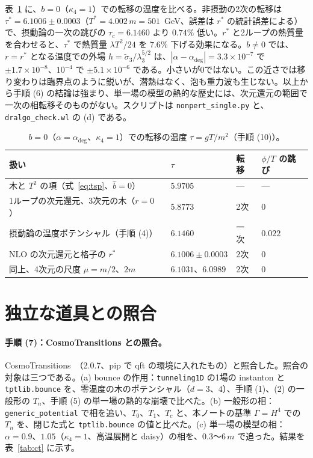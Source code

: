 \documentclass[a4paper,10pt]{ltjsarticle}
\begin{document}
表~\ref{tab:nonpert} に、$b=0$（$\kappa_4=1$）での転移の温度を比べる。非摂動の2次の転移は $\tau^*=6.1006\pm0.0003$（$T^*=4.002\,m=501$~GeV、誤差は $r^*$ の統計誤差による）で、摂動論の一次の跳びの $\tau_c=6.1460$ より $0.74\%$ 低い。$r^*$ と2ループの熱質量を合わせると、$\tau^*$ で熱質量 $\lambda T^2/24$ を $7.6\%$ 下げる効果になる。$b\ne0$ では、$r=r^*$ となる温度での外場 $h=\tilde\sigma_3/\lambda_3^{5/2}$ は、$|\alpha-\alpha_{\mathrm{deg}}|=3.3\times10^{-7}$ で $\pm1.7\times10^{-8}$、$10^{-4}$ で $\pm5.1\times10^{-6}$ である。小さいが0ではない。この近さでは移り変わりは臨界点のように鋭いが、潜熱はなく、泡も重力波も生じない。以上から手順 (6) の結論は強まり、単一場の模型の熱的な歴史には、次元還元の範囲で一次の相転移そのものがない。スクリプトは \texttt{nonpert\_single.py} と、\texttt{dralgo\_check.wl} の (d) である。

\begin{table}[tbp]
\centering\small
\caption{$b=0$（$\alpha=\alpha_{\mathrm{deg}}$、$\kappa_4=1$）での転移の温度 $\tau=gT/m^2$（手順 (10)）。}
\label{tab:nonpert}
\begin{tabular}{llll}
\toprule
扱い & $\tau$ & 転移 & $\phi/T$ の跳び \\
\midrule
木と $T^2$ の項（式~\eqref{eq:tsp}、$\hat b=0$） & $5.9705$ & --- & --- \\
1ループの次元還元、3次元の木（$r=0$） & $5.8773$ & 2次 & $0$ \\
摂動論の温度ポテンシャル（手順 (4)） & $6.1460$ & 一次 & $0.022$ \\
NLO の次元還元と格子の $r^*$ & $6.1006\pm0.0003$ & 2次 & $0$ \\
同上、4次元の尺度 $\mu=m/2$、$2m$ & $6.1031$、$6.0989$ & 2次 & $0$ \\
\bottomrule
\end{tabular}
\end{table}

\FloatBarrier
\section{独立な道具との照合}\label{sec:ct}

\paragraph{手順 (7)：CosmoTransitions との照合。}CosmoTransitions~\cite{wainwright12}（2.0.7、pip で qft の環境に入れたもの）と照合した。照合の対象は三つである。(a) bounce の作用：\texttt{tunneling1D} の1場の instanton と \texttt{tptlib.bounce} を、零温度の木のポテンシャル（$d=3$、$4$）、手順 (1)、(2) の一般形の $T_n$、手順 (5) の単一場の熱的な崩壊で比べた。(b) 一般形の相：\texttt{generic\_potential} で相を追い、$T_0$、$T_1$、$T_c$ と、本ノートの基準 $\Gamma=H^4$ での $T_n$ を、閉じた式と \texttt{tptlib.bounce} の値と比べた。(c) 単一場の模型の相：$\alpha=0.9$、$1.05$（$\kappa_4=1$、高温展開と daisy）の相を、$0.3$〜$6\,m$ で追った。結果を表~\ref{tab:ct} に示す。
\end{document}
